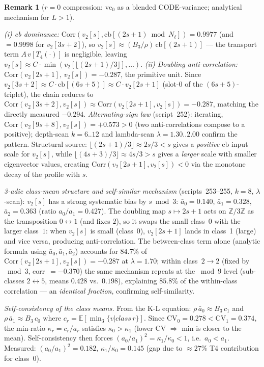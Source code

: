 \documentclass[11pt]{article}
\theoremstyle{definition}
\newtheorem{remark}[theorem]{Remark}
\begin{document}
\begin{remark}[$r{=}0$ compression: $\mathrm{ve}_0$ as a blended CODE-variance;
analytical mechanism for $L>1$]
\begin{itemize}
  \emph{(i) cb dominance:} $\mathrm{Corr}(v_2[s], \mathrm{cb}[(2s{+}1)\!\bmod N_\ell])
  = 0.9977$ (and $= 0.9998$ for $v_2[3s{+}2]$), so $v_2[s]\approx (B_3/\rho)\,
  \mathrm{cb}[(2s{+}1)]$ --- the transport term $A\,v[T_4(\cdot)]$ is negligible,
  leaving $v_2[s] \approx C\cdot\min(v_2[\lfloor(2s{+}1)/3\rfloor],\ldots)$.
  \emph{(ii) Doubling anti-correlation:}
  $\mathrm{Corr}(v_2[2s{+}1],\, v_2[s]) = -0.287$, the primitive unit.
  Since $v_2[3s{+}2] \approx C\cdot\mathrm{cb}[(6s{+}5)] \approx C\cdot v_2[2s{+}1]$
  (slot-0 of the $(6s{+}5)$-triplet), the chain reduces to
  $\mathrm{Corr}(v_2[3s{+}2], v_2[s]) \approx \mathrm{Corr}(v_2[2s{+}1], v_2[s])
  = -0.287$, matching the directly measured $-0.294$.
  \emph{Alternating-sign law} (script~252): iterating,
  $\mathrm{Corr}(v_2[9s{+}8], v_2[s]) = +0.573 > 0$ (two anti-correlations compose
  to a positive); depth-scan $k=6..12$ and lambda-scan $\lambda=1.30..2.00$ confirm
  the pattern.  Structural source: $\lfloor(2s{+}1)/3\rfloor \approx 2s/3 < s$ gives
  a \emph{positive} cb input scale for $v_2[s]$, while $\lfloor(4s{+}3)/3\rfloor
  \approx 4s/3 > s$ gives a \emph{larger} scale with smaller eigenvector values,
  creating $\mathrm{Corr}(v_2[2s{+}1], v_2[s]) < 0$ via the monotone decay of the
  profile with $s$.

  \emph{3-adic class-mean structure and self-similar mechanism}
  (scripts~253--255, $k{=}8$, $\lambda$-scan):
  $v_2[s]$ has a strong systematic bias by $s \bmod 3$:
  $\bar a_0 = 0.140$, $\bar a_1 = 0.328$, $\bar a_2 = 0.363$ (ratio $a_0/a_1 = 0.427$).
  The doubling map $s\mapsto 2s{+}1$ acts on $\mathbb{Z}/3\mathbb{Z}$ as the transposition
  $0\leftrightarrow 1$ (and fixes $2$), so it swaps the small class~$0$ with the
  larger class~$1$: when $v_2[s]$ is small (class~0), $v_2[2s{+}1]$ lands in class~1
  (large) and vice versa, producing anti-correlation.
  The between-class term alone (analytic formula using $\bar a_0, \bar a_1, \bar a_2$)
  accounts for $84.7\%$ of $\mathrm{Corr}(v_2[2s{+}1],v_2[s]) = -0.287$ at
  $\lambda{=}1.70$; within class~$2{\to}2$ (fixed by $\bmod 3$, corr~$=-0.370$) the
  same mechanism repeats at the $\bmod 9$ level (sub-classes $2\leftrightarrow 5$,
  means $0.428$ vs.\ $0.198$), explaining $85.8\%$ of the within-class correlation ---
  an \emph{identical fraction}, confirming self-similarity.

  \emph{Self-consistency of the class means.}
  From the K-L equation: $\rho\,\bar a_0 \approx B_3\,c_1$ and $\rho\,\bar a_1 \approx B_3\,c_0$
  where $c_r = \mathbb{E}[\min_3\{v|class\,r\}]$.
  Since $\mathrm{CV}_0 = 0.278 < \mathrm{CV}_1 = 0.374$, the min-ratio
  $\kappa_r = c_r/a_r$ satisfies $\kappa_0 > \kappa_1$
  (lower CV $\Rightarrow$ min is closer to the mean).
  Self-consistency then forces $(a_0/a_1)^2 = \kappa_1/\kappa_0 < 1$, i.e.\
  $a_0 < a_1$.  Measured: $(a_0/a_1)^2 = 0.182$, $\kappa_1/\kappa_0 = 0.145$
  (gap due to $\approx 27\%$ T4 contribution for class~0).


\end{itemize}
\end{remark}
\end{document}

